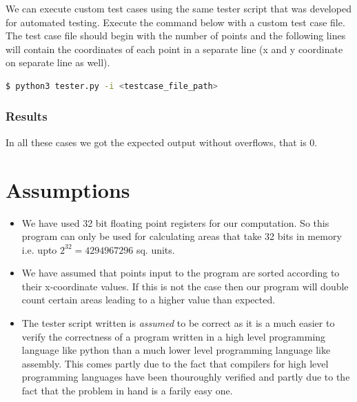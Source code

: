 \documentclass[hidelinks,12pt]{article}
\begin{document}
We can execute custom test cases using the same tester script that was developed for automated testing.
Execute the command below with a custom test case file. The test case file should begin with the number of points
and the following lines will contain the coordinates of each point in a separate line (x and y coordinate on separate line as well).
\begin{lstlisting}[language=bash]
    $ python3 tester.py -i <testcase_file_path>
\end{lstlisting}
\subsubsection{Results}
In all these cases we got the expected output without overflows, that is 0.
\section{Assumptions}
\begin{itemize}
    \item We have used 32 bit floating point registers for our computation. So this program can only be used for calculating areas that take 32
    bits in memory i.e. upto $2^{32} = 4294967296$ sq. units.
    \item We have assumed that points input to the program are sorted according to their x-coordinate values. If this is not the case then our
    program will double count certain areas leading to a higher value than expected.
    \item The tester script written is \textit{assumed} to be correct as it is a much easier to verify the correctness of a program written in a high level
    programming language like python than a much lower level programming language like assembly. This comes partly due to the fact that compilers
    for high level programming languages have been thouroughly verified and partly due to the fact that the problem in hand is a farily easy one.
\end{itemize}
\end{document}
